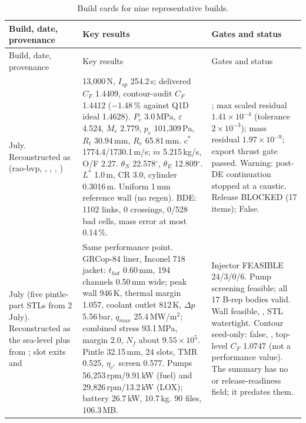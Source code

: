 {\scriptsize
\begin{longtable}{P{3.3cm}P{7.4cm}P{5.25cm}}
\caption{Build cards for nine representative builds.}\label{tab:build-cards}\\
\toprule
Build, date, provenance & Key results & Gates and status\\
\midrule
\endfirsthead
\toprule
Build, date, provenance & Key results & Gates and status\\
\midrule
\endhead
\bottomrule
\endfoot
{} July. Reconstructed as  (rao-bvp,  ,  ,  , ) &
13,000\,N, $I_{sp}$ 254.2\,s; delivered $C_F$ 1.4409, contour-audit $C_F$ 1.4412 ($-1.48$\,\% against Q1D ideal 1.4628). $P_c$ 3.0\,MPa, $\varepsilon$ 4.524, $M_e$ 2.779, $p_e$ 101,309\,Pa, $R_t$ 30.94\,mm, $R_e$ 65.81\,mm. $c^*$ 1774.4/1730.1\,m/s; $\dot m$ 5.215\,kg/s, O/F 2.27. $\theta_N$ 22.578$^\circ$, $\theta_E$ 12.809$^\circ$. $L^*$ 1.0\,m, CR 3.0, cylinder 0.3016\,m. Uniform 1\,mm reference wall (no regen). BDE: 1102 links, 0 crossings, 0/528 bad cells, mass error at most 0.14\,\%. &
; max scaled residual $1.41\times10^{-4}$ (tolerance $2\times10^{-3}$); mass residual $1.97\times10^{-9}$; export thrust gate passed. Warning: post-DE continuation stopped at a caustic. Release BLOCKED (17 items);  False.\\
\midrule
{} July (five pintle-part STLs from 2 July). Reconstructed as the sea-level  plus   from ; slot exits and   &
Same performance point. GRCop-84 liner, Inconel 718 jacket: $t_{hot}$ 0.60\,mm, 194 channels 0.50\,mm wide; peak wall 946\,K, thermal margin 1.057, coolant outlet 812\,K, $\Delta p$ 5.56\,bar, $q_{max}$ 25.4\,MW/m$^2$; combined stress 93.1\,MPa, margin 2.0, $N_f$ about $9.55\times10^5$. Pintle 32.15\,mm, 24 slots, TMR 0.525, $\eta_{c^*}$ screen 0.577. Pumps 56,253\,rpm/9.91\,kW (fuel) and 29,826\,rpm/13.2\,kW (LOX); battery 26.7\,kW, 10.7\,kg. 90 files, 106.3\,MB. &
Injector FEASIBLE 24/3/0/6. Pump screening feasible; all 17 B-rep bodies valid. Wall feasible, , STL watertight. Contour seed-only:  false, , top-level $C_F$ 1.0747 (not a performance value). The summary has no  or release-readiness field; it predates them.\\

\end{longtable}}
